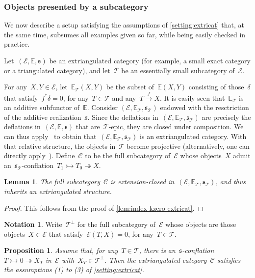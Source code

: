 \documentclass{amsart}
\newtheorem{proposition}[theorem]{Proposition}
\newtheorem{lemma}[theorem]{Lemma}
\theoremstyle{definition}
\newtheorem{notation}[theorem]{Notation}
\newcommand{\cat}{\mathcal{C}}
\newcommand{\tc}{\mathcal{T}}
\newcommand{\ec}{\mathcal{E}}
\newcommand{\infl}{\rightarrowtail}
\newcommand{\defl}{\twoheadrightarrow}
\begin{document}
\subsubsection{Objects presented by a subcategory}
\label{sec:prT}

We now describe a setup satisfying the assumptions of \cref{setting:extricat} that, at the same time, subsumes all examples given so far, while being easily checked in practice.

Let~$(\ec,\mathbb{E},\mathfrak{s})$ be an extriangulated category (for example, a small exact category or a triangulated category), and let~$\tc$ be an essentially small subcategory of~$\ec$.

For any~$X,Y\in\ec$, let~$\mathbb{E}_\tc(X,Y)$ be the subset of~$\mathbb{E}(X,Y)$ consisting of those~$\delta$ that satisfy~$f^\ast\delta = 0$, for any~$T\in\tc$ and any~$T\xrightarrow{f}X$.
It is easily seen that~$\mathbb{E}_\tc$ is an additive subfunctor of~$\mathbb{E}$.
Consider $(\ec,\mathbb{E}_\tc,\mathfrak{s}_\tc)$ endowed with the resctriction of the additive realization~$\mathfrak{s}$.
Since the deflations in~$(\ec,\mathbb{E}_\tc,\mathfrak{s}_\tc)$ are precisely the deflations in~$(\ec,\mathbb{E},\mathfrak{s})$ that are~$\tc$-epic, they are closed under composition.
We can thus apply~\cite[Prop.~3.16]{HerschendLiuNakaokaI} to obtain that~$(\ec,\mathbb{E}_\tc,\mathfrak{s}_\tc)$ is an extriangulated category.
With that relative structure, the objects in~$\tc$ become projective
(alternatively, one can directly apply~\cite[Prop.~3.19]{HerschendLiuNakaokaI}).
Define~$\cat$ to be the full subcategory of~$\ec$ whose objects~$X$ admit an~$\mathfrak{s}_\tc$-conflation~$T_1\infl T_0\defl X$.

\begin{lemma}
\label{lem: prT is extriangulated}
The full subcategory~$\cat$ is extension-closed in~$(\ec,\mathbb{E}_\tc,\mathfrak{s}_\tc)$, and thus inherits an extriangulated structure.
\end{lemma}

\begin{proof}
This follows from the proof of \cref{lem:index kzero extricat}.
\end{proof}

\begin{notation}
Write~$\tc^\perp$ for the full subcategory of~$\ec$ whose objects are those objects~$X\in\ec$ that satisfy~$\ec(T,X)=0$, for any~$T\in\tc$.
\end{notation}

\begin{proposition}
\label{prop:prT}
Assume that, for any~$T\in\tc$, there is an~$\mathfrak{s}$-conflation~$T\infl 0\defl X_T$ in~$\ec$ with~$X_T\in\tc^\perp$.
Then the extriangulated category~$\cat$ satisfies the assumptions (1) to (3) of \cref{setting:extricat}.
\end{proposition}
\end{document}
